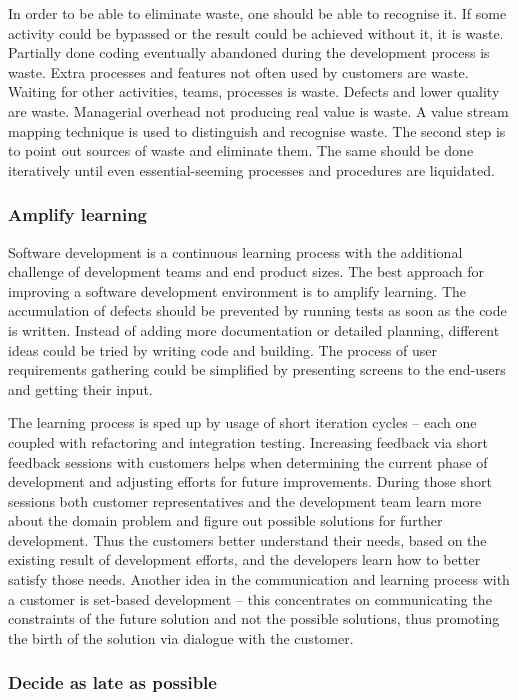 In order to be able to eliminate waste, one should be able to recognise it. If some activity could be bypassed or the result could be achieved without it, it is waste. Partially done coding eventually abandoned during the development process is waste. Extra processes and features not often used by customers are waste. Waiting for other activities, teams, processes is waste. Defects and lower quality are waste. Managerial overhead not producing real value is waste. A value stream mapping technique is used to distinguish and recognise waste. The second step is to point out sources of waste and eliminate them. The same should be done iteratively until even essential-seeming processes and procedures are liquidated.

\subsubsection{Amplify learning}

Software development is a continuous learning process with the additional challenge of development teams and end product sizes. The best approach for improving a software development environment is to amplify learning. The accumulation of defects should be prevented by running tests as soon as the code is written. Instead of adding more documentation or detailed planning, different ideas could be tried by writing code and building. The process of user requirements gathering could be simplified by presenting screens to the end-users and getting their input.

The learning process is sped up by usage of short iteration cycles -- each one coupled with refactoring and integration testing. Increasing feedback via short feedback sessions with customers helps when determining the current phase of development and adjusting efforts for future improvements. During those short sessions both customer representatives and the development team learn more about the domain problem and figure out possible solutions for further development. Thus the customers better understand their needs, based on the existing result of development efforts, and the developers learn how to better satisfy those needs. Another idea in the communication and learning process with a customer is set-based development -- this concentrates on communicating the constraints of the future solution and not the possible solutions, thus promoting the birth of the solution via dialogue with the customer.

\subsubsection{Decide as late as possible}

